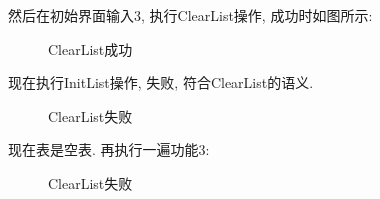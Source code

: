 \documentclass[supercite]{Experimental_Report}
\theoremstyle{definition}
\begin{document}
\noindent
然后在初始界面输入3, 执行ClearList操作, 成功时如图所示:
\begin{figure}[htbp]
	\centering
	\centering
	\centering
	\caption{ClearList成功}
	\label{fig1-11}
\end{figure}

\clearpage
\noindent
现在执行InitList操作, 失败, 符合ClearList的语义.
\begin{figure}[htbp]
	\centering
	\centering
	\caption{ClearList失败}
	\label{fig1-12}
\end{figure}

\noindent
现在表是空表. 再执行一遍功能3:
\begin{figure}[htbp]
	\centering
	\centering
	\caption{ClearList失败}
	\label{fig1-13}
\end{figure}
\end{document}
